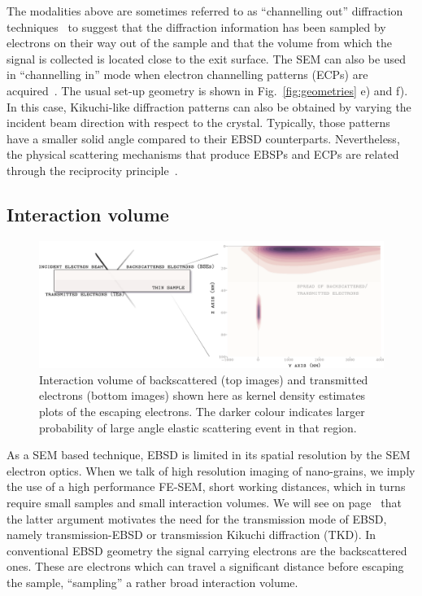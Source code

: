 The modalities above are sometimes referred to as ``channelling out'' diffraction techniques~\cite{joy1994} to suggest that the diffraction information has been sampled by electrons on their way out of the sample and that the volume from which the signal is collected is located close to the exit surface. The SEM can also be used in ``channelling in'' mode when electron channelling patterns (ECPs) are acquired~\cite{Coates67,Joy82}. The usual set-up  geometry is shown in Fig.~\ref{fig:geometries} e) and f). In this case, Kikuchi-like diffraction patterns can also be obtained by varying the incident beam direction with respect to the crystal. Typically, those patterns have a smaller solid angle compared to their EBSD counterparts. Nevertheless, the physical scattering mechanisms that produce EBSPs and ECPs are related through the reciprocity principle~\cite{reimerSEM}.

\subsection{Interaction volume}


\begin{figure}[ht]
\centering
\includegraphics[width=1.1\linewidth]{Figures/TKDpendepth.png}
\caption[Interaction volume]{Interaction volume of backscattered (top images) and transmitted electrons (bottom images) shown here as kernel density estimates plots of the escaping electrons. The darker colour indicates larger probability of large angle elastic scattering event in that region.}
\label{fig:intvolume}
\end{figure}



As a SEM based technique, EBSD is limited in its spatial resolution by the SEM electron optics. When we talk of high resolution imaging of nano-grains, we imply the use of a high performance FE-SEM, short working distances, which in turns require small samples and small interaction volumes. We will see on page~\pageref{sec:motivation} that the latter argument motivates the need for the transmission mode of EBSD, namely transmission-EBSD or transmission Kikuchi diffraction (TKD). In conventional EBSD geometry the signal carrying electrons are the backscattered ones. These are electrons which can travel a significant distance before escaping the sample, ``sampling'' a rather broad interaction volume. 




